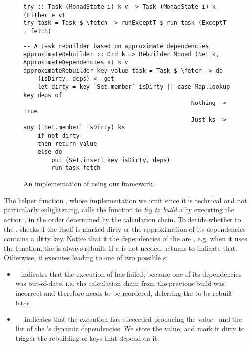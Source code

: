\begin{figure}
\begin{verbatim}
try :: Task (MonadState i) k v -> Task (MonadState i) k (Either e v)
try task = Task $ \fetch -> runExceptT $ run task (ExceptT . fetch)
\end{verbatim}
\vspace{1mm}
\begin{verbatim}
-- A task rebuilder based on approximate dependencies
approximateRebuilder :: Ord k => Rebuilder Monad (Set k, ApproximateDependencies k) k v
approximateRebuilder key value task = Task $ \fetch -> do
    (isDirty, deps) <- get
    let dirty = key `Set.member` isDirty || case Map.lookup key deps of
                                                Nothing -> True
                                                Just ks -> any (`Set.member` isDirty) ks
    if not dirty
    then return value
    else do
        put (Set.insert key isDirty, deps)
        run task fetch
\end{verbatim}
\vspace{-2mm}
\caption{An implementation of \Excel using our framework.}\label{fig-excel-implementation}
\vspace{-2mm}
\end{figure}

The helper function , whose implementation we omit since it is
technical and not particularly enlightening, calls the function  to
\emph{try to build} a  by executing the action , in the order
determined by the calculation chain. To decide whether to  the
,  checks if the  itself is marked dirty or the
approximation of its dependencies contains a dirty key. Notice that if the
dependencies of the  are , e.g. when it uses the
 function, the  is always rebuilt. If a  is
not needed,  returns  to indicate that. Otherwise, it
executes  leading to one of two possible s:

\begin{itemize}
    \item {}~ indicates that the execution of  has
    failed, because one of its dependencies  was out-of-date, i.e. the
    calculation chain from the previous build was incorrect and therefore needs
    to be reordered, deferring the  to be rebuilt later.
    \item {}~~ indicates that the
    execution has succeeded producing the value~ and the list of the
    's dynamic dependencies. We store the value, and mark it dirty to
    trigger the rebuilding of keys that depend on it.
\end{itemize}


